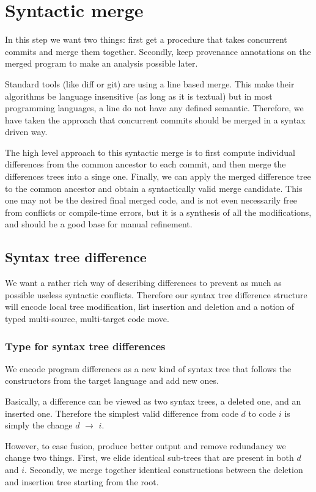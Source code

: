 \documentclass[a4paper,10pt]{article}
\begin{document}
\section{Syntactic merge}
In this step we want two things: first get a procedure that takes concurrent commits and merge them together. Secondly, keep provenance annotations on the merged program to make an analysis possible later.

Standard tools (like diff or git) are using a line based merge. This make their algorithms be language insensitive (as long as it is textual) but in most programming languages, a line do not have any defined semantic. Therefore, we have taken the approach that concurrent commits should be merged in a syntax driven way.

The high level approach to this syntactic merge is to first compute individual differences from the common ancestor to each commit, and then merge the differences trees into a singe one. Finally, we can apply the merged difference tree to the common ancestor and obtain a syntactically valid merge candidate. This one may not be the desired final merged code, and is not even necessarily free from conflicts or compile-time errors, but it is a synthesis of all the modifications, and should be a good base for manual refinement.

\subsection{Syntax tree difference}
We want a rather rich way of describing differences to prevent as much as possible useless syntactic conflicts.
Therefore our syntax tree difference structure will encode local tree modification, list insertion and deletion and a notion of typed multi-source, multi-target code move.

\subsubsection{Type for syntax tree differences}
We encode program differences as a new kind of syntax tree that follows the constructors from the target language and add new ones.

Basically, a difference can be viewed as two syntax trees, a deleted one, and an inserted one. Therefore the simplest valid difference from code $d$ to code $i$ is simply the change \st{$d$} $\rightarrow$ \ul{$i$}.

However, to ease fusion, produce better output and remove redundancy we change two things.
First, we elide identical sub-trees that are present in both $d$ and $i$.
Secondly, we merge together identical constructions between the deletion and insertion tree starting from the root.
\end{document}

